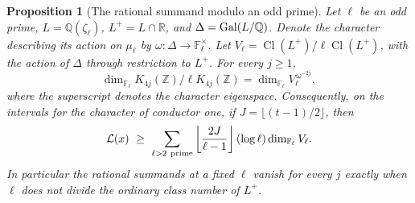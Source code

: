\documentclass[a4paper,11pt]{article}
\newtheorem{proposition}{Proposition}[section]
\theoremstyle{definition}
\theoremstyle{remark}
\newcommand{\RR}{\mathbb R}\newcommand{\CC}{\mathbb C}\newcommand{\QQ}{\mathbb Q}
\newcommand{\ZZ}{\mathbb Z}\newcommand{\ord}{\operatorname{ord}}
\numberwithin{equation}{section}
\begin{document}
\begin{proposition}[The rational summand modulo an odd prime]
\label{prop:realclass100}
Let \(\ell\) be an odd prime, \(L=\QQ(\zeta_\ell)\), \(L^+=L\cap\RR\),
and \(\Delta=\Gal(L/\QQ)\). Denote the character describing its
action on \(\mu_\ell\) by \(\omega:\Delta\to\mathbb F_\ell^\times\).
Let \(V_\ell=\operatorname{Cl}(L^+)/\ell\operatorname{Cl}(L^+)\),
with the action of \(\Delta\) through restriction to \(L^+\).
For every \(j\ge1\),
\[
 \dim_{\mathbb F_\ell}K_{4j}(\ZZ)/\ell K_{4j}(\ZZ)
       =\dim_{\mathbb F_\ell} V_\ell^{\,\omega^{-2j}},
\]
where the superscript denotes the character eigenspace.
Consequently, on the intervals for the character of conductor one,
if \(J=\lfloor(t-1)/2\rfloor\), then
\[
       \mathcal L(x)\ \ge\
       \sum_{\ell>2\ {\rm prime}}
       \left\lfloor\frac{2J}{\ell-1}\right\rfloor
                (\log\ell)\dim_{\mathbb F_\ell} V_\ell .
\]
In particular the rational summands at a fixed \(\ell\) vanish for
every \(j\) exactly when \(\ell\) does not divide the ordinary
class number of \(L^+\).
\end{proposition}
\end{document}
